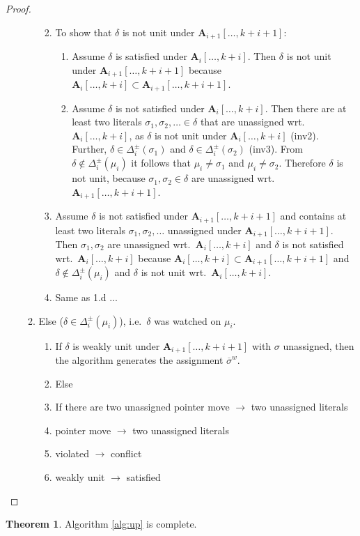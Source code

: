 \documentclass{vutinfth} %
\theoremstyle{example}
\theoremstyle{definition}
\theoremstyle{theorem}
\newtheorem{theorem}{Theorem}[section]
\theoremstyle{lemma}
\theoremstyle{corollary}
\newcommand{\negweak}[1]{\overline{#1}^w}
\newcommand{\ass}{\mathbf{A}}
\newcommand{\abef}{\ass_{i}[\ldots, k + i]}
\newcommand{\aaf}{\ass_{i + 1}[\ldots, k + i + 1]}
\newcommand{\dbef}{\Delta_{i}}
\newcommand{\sgl}{\mu}
\newcommand{\bsgl}{\sigma}
\begin{document}
\begin{proof}
\begin{enumerate}
\begin{enumerate}
\begin{enumerate}
\begin{enumerate}
\end{enumerate}
\item To show that $\delta$ is not unit under $\aaf$:
\begin{enumerate}
\item Assume $\delta$ is satisfied under $\abef$. Then $\delta$ is not unit under $\aaf$ because $\abef \subset \aaf$.
\item Assume $\delta$ is not satisfied under $\abef$. Then there are at least two literals $\bsgl_1, \bsgl_2, \ldots \in \delta$ that are unassigned wrt.~$\abef$, as $\delta$ is not unit under $\abef$ (inv2). Further, $\delta \in \dbef^\pm(\bsgl_1)$ and $\delta \in \dbef^\pm(\bsgl_2)$ (inv3). From $\delta \not \in \dbef^\pm(\sgl_i)$ it follows that $\sgl_i \not = \bsgl_1$ and $\sgl_i \not = \bsgl_2$. %
Therefore $\delta$ is not unit, because $\bsgl_1, \bsgl_2 \in \delta$ are unassigned wrt.~$\aaf$.
\end{enumerate}
\item Assume $\delta$ is not satisfied under $\aaf$ and contains at least two literals $\bsgl_1, \bsgl_2, \ldots$ unassigned under $\aaf$. Then $\bsgl_1, \bsgl_2$ are unassigned wrt.~$\abef$ and $\delta$ is not satisfied wrt.~$\abef$ because $\abef \subset \aaf$ and $\delta \not \in \dbef^\pm(\sgl_i)$ and $\delta$ is not unit wrt.~$\abef$.
\item Same as 1.d ...
\end{enumerate}
\item Else ($\delta \in \dbef^\pm(\sgl_i)$), i.e.~$\delta$ was watched on $\sgl_i$.
\begin{enumerate}
\item If $\delta$ is weakly unit under $\aaf$ with $\bsgl$ unassigned, then the algorithm generates the assignment $\negweak{\bsgl}$.
\item Else
\item If there are two unassigned pointer move $\to$ two unassigned literals
\item pointer move $\to$ two unassigned literals
\item violated $\to$ conflict
\item weakly unit $\to$ satisfied
\end{enumerate}
\end{enumerate}
\end{enumerate}
\end{proof}

\begin{theorem}
Algorithm \ref{alg:up} is complete.
\end{theorem}
\end{document}
